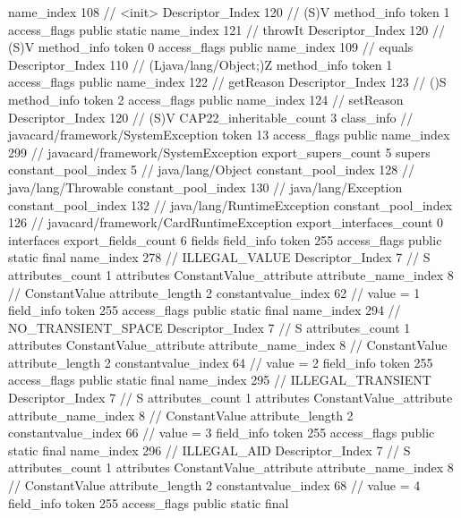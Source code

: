 {{{{{					name_index	108		// <init>
					Descriptor_Index	120		// (S)V
				}
				method_info {
					token	1
					access_flags	public static
					name_index	121		// throwIt
					Descriptor_Index	120		// (S)V
				}
				method_info {
					token	0
					access_flags	public
					name_index	109		// equals
					Descriptor_Index	110		// (Ljava/lang/Object;)Z
				}
				method_info {
					token	1
					access_flags	public
					name_index	122		// getReason
					Descriptor_Index	123		// ()S
				}
				method_info {
					token	2
					access_flags	public
					name_index	124		// setReason
					Descriptor_Index	120		// (S)V
				}
			}
			CAP22_inheritable_count	3
		}
		class_info {		// javacard/framework/SystemException
			token	13
			access_flags	public
			name_index	299		// javacard/framework/SystemException
			export_supers_count	5
			supers {
				constant_pool_index	5		// java/lang/Object
				constant_pool_index	128		// java/lang/Throwable
				constant_pool_index	130		// java/lang/Exception
				constant_pool_index	132		// java/lang/RuntimeException
				constant_pool_index	126		// javacard/framework/CardRuntimeException
			}
			export_interfaces_count	0
			interfaces {
			}
			export_fields_count	6
			fields {
			field_info {
				token	255
				access_flags	public static final
				name_index	278		// ILLEGAL_VALUE
				Descriptor_Index	7		// S
				attributes_count	1
				attributes {
				ConstantValue_attribute {
					attribute_name_index	8		// ConstantValue
					attribute_length	2
					constantvalue_index	62		// value = 1
				}
				}
			}
			field_info {
				token	255
				access_flags	public static final
				name_index	294		// NO_TRANSIENT_SPACE
				Descriptor_Index	7		// S
				attributes_count	1
				attributes {
				ConstantValue_attribute {
					attribute_name_index	8		// ConstantValue
					attribute_length	2
					constantvalue_index	64		// value = 2
				}
				}
			}
			field_info {
				token	255
				access_flags	public static final
				name_index	295		// ILLEGAL_TRANSIENT
				Descriptor_Index	7		// S
				attributes_count	1
				attributes {
				ConstantValue_attribute {
					attribute_name_index	8		// ConstantValue
					attribute_length	2
					constantvalue_index	66		// value = 3
				}
				}
			}
			field_info {
				token	255
				access_flags	public static final
				name_index	296		// ILLEGAL_AID
				Descriptor_Index	7		// S
				attributes_count	1
				attributes {
				ConstantValue_attribute {
					attribute_name_index	8		// ConstantValue
					attribute_length	2
					constantvalue_index	68		// value = 4
				}
				}
			}
			field_info {
				token	255
				access_flags	public static final
}}}}}
